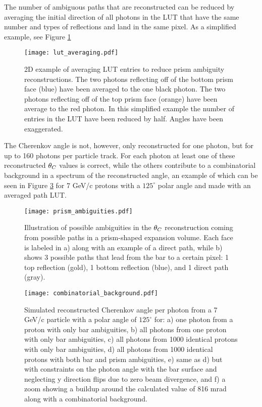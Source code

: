 The number of ambiguous paths that are reconstructed can be reduced by averaging the initial direction of all photons in the LUT that have the same number and types of reflections and land in the same pixel. As a simplified example, see Figure \ref{fig:lut_averaging}

\begin{figure}[!htb]
	\centering
	\texttt{[image: lut\_averaging.pdf]}
	\caption{2D example of averaging LUT entries to reduce prism ambiguity reconstructions. The two photons reflecting off of the bottom prism face (blue) have been averaged to the one black photon. The two photons reflecting off of the top prism face (orange) have been average to the red photon. In this simplified example the number of entries in the LUT have been reduced by half. Angles have been exaggerated.}
	\label{fig:lut_averaging}
\end{figure}

The Cherenkov angle is not, however, only reconstructed for one photon, but for up to 160 photons per particle track. For each photon at least one of these reconstructed $\theta_{C}$ values is correct, while the others contribute to a combinatorial background in a spectrum of the reconstructed angle, an example of which can be seen in Figure \ref{fig:combinatorial_background} for 7 GeV/c protons with a $125^{\circ}$ polar angle and made with an averaged path LUT.

\begin{figure}[!htb]
	\centering
	\texttt{[image: prism\_ambiguities.pdf]}
	\caption{Illustration of possible ambiguities in the $\theta_{C}$ reconstruction coming from possible paths in a prism-shaped expansion volume. Each face is labeled in a) along with an example of a direct path, while b) shows 3 possible paths that lead from the bar to a certain pixel: 1 top reflection (gold), 1 bottom reflection (blue), and 1 direct path (gray).}
	\label{fig:prism_ambiguities}
\end{figure}

\begin{figure}[!htb]
	\centering
	\texttt{[image: combinatorial\_background.pdf]}
	\caption{Simulated reconstructed Cherenkov angle per photon from a 7 GeV/c particle with a polar angle of $125^{\circ}$ for: a) one photon from a proton with only bar ambiguities, b) all photons from one proton with only bar ambiguities, c) all photons from 1000 identical protons with only bar ambiguities, d) all photons from 1000 identical protons with both bar and prism ambiguities, e) same as d) but with constraints on the photon angle with the bar surface and neglecting y direction flips due to zero beam divergence, and f) a zoom showing a buildup around the calculated value of 816 mrad along with a combinatorial background.}
	\label{fig:combinatorial_background}
\end{figure}

